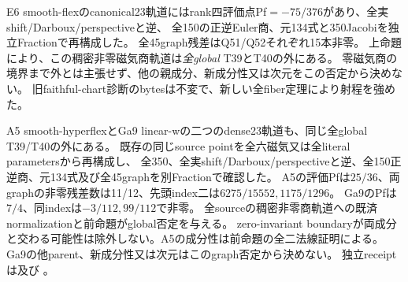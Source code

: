 \documentclass[a4paper,11pt]{ltjsarticle}
\theoremstyle{definition}
\begin{document}
E6 smooth-flexのcanonical23軌道にはrank四評価点Pf$=-75/376$があり、全実shift/Darboux/perspectiveと逆、
全150の正逆Euler商、元134式と350Jacobiを独立Fractionで再構成した。
全45graph残差はQ51/Q52それぞれ15本非零。
上命題により、この稠密非零磁気商軌道は\emph{全global} T39とT40の外にある。
零磁気商の境界まで外とは主張せず、他の親成分、新成分性又は次元をこの否定から決めない。
旧faithful-chart診断のbytesは不変で、新しい全fiber定理により射程を強めた。

A5 smooth-hyperflexとGa9 linear-wの二つのdense23軌道も、同じ全global T39/T40の外にある。
既存の同じsource pointを全六磁気又は全literal parametersから再構成し、
全350、全実shift/Darboux/perspectiveと逆、全150正逆商、元134式及び全45graphを別Fractionで確認した。
A5の評価Pfは$25/36$、両graphの非零残差数は11/12、先頭index二は$6275/15552,1175/1296$。
Ga9のPfは$7/4$、同indexは$-3/112,99/112$で非零。
全sourceの稠密非零商軌道への既済normalizationと前命題がglobal否定を与える。
zero-invariant boundaryが両成分と交わる可能性は除外しない。A5の成分性は前命題の全二法線証明による。
Ga9の他parent、新成分性又は次元はこのgraph否定から決めない。
独立receiptは及び
。
\end{document}
